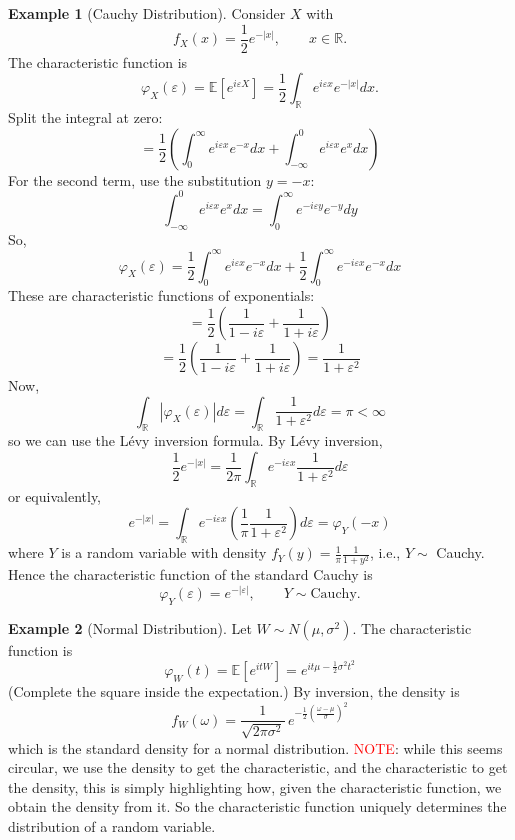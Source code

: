 \documentclass[11pt,a4paper]{article}
\theoremstyle{definition}
\newtheorem{example}{Example}[section]
\begin{document}
\begin{example}[Cauchy Distribution]
Consider $X$ with
\[
f_X(x) = \frac{1}{2} e^{-|x|}, \qquad x \in \mathbb{R}.
\]
The characteristic function is
\[
\varphi_X(\varepsilon) = \mathbb{E}[e^{i\varepsilon X}] = \frac{1}{2} \int_{\mathbb{R}} e^{i\varepsilon x} e^{-|x|} dx.
\]
Split the integral at zero:
\[
= \frac{1}{2} \left( \int_{0}^{\infty} e^{i\varepsilon x} e^{-x} dx + \int_{-\infty}^{0} e^{i\varepsilon x} e^{x} dx \right)
\]
For the second term, use the substitution $y = -x$:
\[
\int_{-\infty}^0 e^{i\varepsilon x} e^{x} dx = \int_{0}^{\infty} e^{-i\varepsilon y} e^{-y} dy
\]
So,
\[
\varphi_X(\varepsilon) = \frac{1}{2} \int_{0}^{\infty} e^{i\varepsilon x} e^{-x} dx
+ \frac{1}{2} \int_{0}^{\infty} e^{-i\varepsilon x} e^{-x} dx
\]
These are characteristic functions of exponentials:
\[
= \frac{1}{2} \left( \frac{1}{1-i\varepsilon} + \frac{1}{1+i\varepsilon} \right)
\]
\[
= \frac{1}{2} \left( \frac{1}{1-i\varepsilon} + \frac{1}{1+i\varepsilon} \right)
= \frac{1}{1+\varepsilon^2}
\]
Now,
\[
\int_{\mathbb{R}} |\varphi_X(\varepsilon)| d\varepsilon = \int_{\mathbb{R}} \frac{1}{1+\varepsilon^2} d\varepsilon = \pi < \infty
\]
so we can use the Lévy inversion formula. By Lévy inversion,
\[
\frac{1}{2} e^{-|x|} = \frac{1}{2\pi} \int_{\mathbb{R}} e^{-i\varepsilon x} \frac{1}{1+\varepsilon^2} d\varepsilon
\]
or equivalently,
\[
e^{-|x|} = \int_{\mathbb{R}} e^{-i\varepsilon x} \left( \frac{1}{\pi} \frac{1}{1+\varepsilon^2} \right) d\varepsilon
= \varphi_Y(-x)
\]
where $Y$ is a random variable with density $f_Y(y) = \frac{1}{\pi} \frac{1}{1 + y^2}$, i.e., $Y \sim$ Cauchy. Hence the characteristic function of the standard Cauchy is
\[
\varphi_Y(\varepsilon) = e^{-|\varepsilon|}, \qquad Y \sim \text{Cauchy}.
\]

\end{example}

\begin{example}[Normal Distribution]
Let $W \sim N(\mu, \sigma^2)$. The characteristic function is
\[
\varphi_W(t) = \mathbb{E}[e^{it W}] = e^{i t \mu - \frac{1}{2} \sigma^2 t^2}
\]
(Complete the square inside the expectation.) By inversion, the density is
\[
f_W(\omega) = \frac{1}{\sqrt{2\pi \sigma^2}} \, e^{-\frac{1}{2} \left( \frac{\omega - \mu}{\sigma} \right)^2}
\]
which is the standard density for a normal distribution. \textcolor{red}{NOTE}: while this seems circular, we use the density to get the characteristic, and the characteristic to get the density, this is simply highlighting how, given the characteristic function, we obtain the density from it. So the characteristic function uniquely determines the distribution of a random variable.

\end{example}
\end{document}
